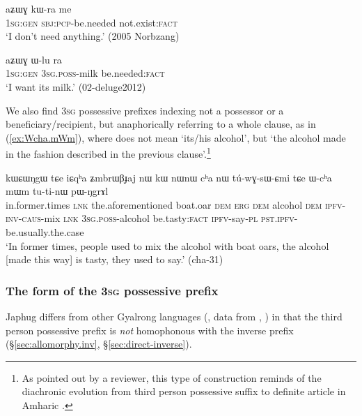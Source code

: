  \begin{exe}
\ex \label{ex:aZWG.kWra}
\gll  aʑɯɣ kɯ-ra me \\
\textsc{1sg}:\textsc{gen} \textsc{sbj}:\textsc{pcp}-be.needed not.exist:\textsc{fact} \\
\glt `I don't need anything.' (2005 Norbzang)
\end{exe}

 \begin{exe}
\ex \label{ex:aZWG.Wlu}
\gll aʑɯɣ ɯ-lu ra \\
\textsc{1sg}:\textsc{gen} \textsc{3sg}.\textsc{poss}-milk be.needed:\textsc{fact} \\
\glt `I want its milk.' (02-deluge2012) 
\end{exe}

We also find \textsc{3sg} possessive prefixes  indexing not a possessor or a beneficiary/recipient, but anaphorically referring to a whole clause, as in (\ref{ex:Wcha.mWm}), where  does not mean `its/his alcohol', but `the alcohol made in the fashion described in the previous clause'.\footnote{As pointed out by a reviewer, this type of construction reminds of the diachronic evolution from third person possessive suffix to definite article in Amharic \citep{rubin10amharic}. }

 \begin{exe}
\ex \label{ex:Wcha.mWm}
\gll  kɯɕɯŋgɯ tɕe iɕqʰa ʑmbrɯβɟaj nɯ kɯ nɯnɯ cʰa nɯ tú-wɣ-sɯ-ɕmi tɕe 
ɯ-cʰa mɯm tu-ti-nɯ pɯ-ŋgrɤl \\
in.former.times \textsc{lnk} the.aforementioned boat.oar \textsc{dem} \textsc{erg} \textsc{dem} alcohol \textsc{dem} \textsc{ipfv}-\textsc{inv}-\textsc{caus}-mix \textsc{lnk} \textsc{3sg}.\textsc{poss}-alcohol be.tasty:\textsc{fact} \textsc{ipfv}-say-\textsc{pl} \textsc{pst}.\textsc{ipfv}-be.usually.the.case \\
\glt `In former times, people used to mix the alcohol with boat oars, the alcohol [made this way] is tasty, they used to say.' (cha-31)
\end{exe}


\subsubsection{The form of the \textsc{3sg} possessive prefix} \label{sec:3sg.possessive.form}
Japhug differs from other Gyalrong languages (, data from \citealt{jackson02rentongdengdi}, \citealt{gongxun14agreement}) in that the third person possessive prefix is \textit{not} homophonous with the inverse prefix  (§\ref{sec:allomorphy.inv}, §\ref{sec:direct-inverse}).

